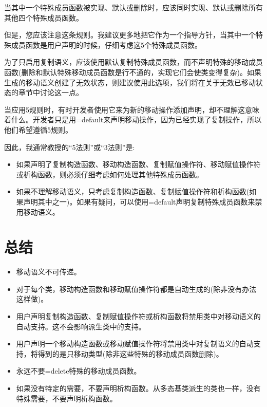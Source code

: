 当其中一个特殊成员函数被实现、默认或删除时，应该同时实现、默认或删除所有其他四个特殊成员函数。\par

但是，您应该注意这条规则。我建议更多地把它作为一个指导方针，当其中一个特殊成员函数是用户声明的时候，仔细考虑这5个特殊成员函数。\par

为了只启用复制语义，应该使用默认复制特殊成员函数，而不声明特殊的移动成员函数(删除和默认特殊移动成员函数是行不通的，实现它们会使类变得复杂)。如果生成的移动语义创建了无效状态，则建议使用此选项，我们将在关于无效已移动状态的章节中讨论这一点。\par

当应用5规则时，有时开发者使用它来为新的移动操作添加声明，却不理解这意味着什么。开发者只是用=default来声明移动操作，因为已经实现了复制操作，所以他们希望遵循5规则。\par

因此，我通常教授的“5法则”或“3法则”是:\par

\begin{itemize}
  \item 如果声明了复制构造函数、移动构造函数、复制赋值操作符、移动赋值操作符或析构函数，则必须仔细考虑如何处理其他特殊成员函数。
  \item 如果不理解移动语义，只考虑复制构造函数、复制赋值操作符和析构函数(如果声明其中之一)。如果有疑问，可以使用=default声明复制特殊成员函数来禁用移动语义。
\end{itemize}


\section{总结}

\begin{itemize}
  \item 移动语义不可传递。
  \item 对于每个类，移动构造函数和移动赋值操作符都是自动生成的(除非没有办法这样做)。
  \item 用户声明复制构造函数、复制赋值操作符或析构函数将禁用类中对移动语义的自动支持。这不会影响派生类中的支持。
  \item 用户声明一个移动构造函数或移动赋值操作符将禁用类中对复制语义的自动支持，将得到的是只移动类型(除非这些特殊的移动成员函数删除)。
  \item 永远不要=delete特殊的移动成员函数。
  \item 如果没有特定的需要，不要声明析构函数。从多态基类派生的类也一样，没有特殊需要，不要声明析构函数。
\end{itemize}
